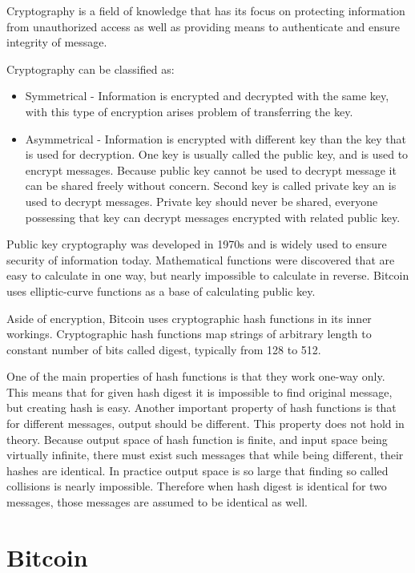 \documentclass[12pt, en, eng, oneside]{mgr}
\begin{document}
Cryptography is a field of knowledge that has its focus on protecting information from unauthorized access as well as providing means to authenticate and ensure integrity of message.

Cryptography can be classified as:

\begin{itemize}
\item
Symmetrical - Information is encrypted and decrypted with the same key, with this type of encryption arises problem of transferring the key.
\item
Asymmetrical - Information is encrypted with different key than the key that is used for decryption. One key is usually called the public key, and is used to encrypt messages. Because public key cannot be used to decrypt message it can be shared freely without concern. Second key is called private key an is used to decrypt messages. Private key should never be shared, everyone possessing that key can decrypt messages encrypted with related public key.
\end{itemize} 

Public key cryptography was developed in 1970s and is widely used to ensure security of information today. Mathematical functions were discovered that are easy to calculate in one way, but nearly impossible to calculate in reverse. Bitcoin uses elliptic-curve functions as a base of calculating public key.\cite{bartek}

Aside of encryption, Bitcoin uses cryptographic hash functions in its inner workings. Cryptographic hash functions map strings of arbitrary length to constant number of bits called digest, typically from 128 to 512. 

One of the main properties of hash functions is that they work one-way only. This means that for given hash digest it is impossible to find original message, but creating hash is easy. Another important property of hash functions is that for different messages, output should be different. This property does not hold in theory. Because output space of hash function is finite, and input space being virtually infinite, there must exist such messages that while being different, their hashes are identical. In practice output space is so large that finding so called collisions is nearly impossible. Therefore when hash digest is identical for two messages, those messages are assumed to be identical as well.  \cite{hash-functions}


\chapter{Bitcoin}
\end{document}
